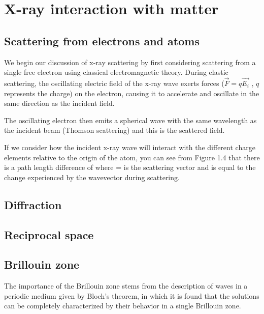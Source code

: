 \section{X-ray interaction with matter}

\subsection{Scattering from electrons and atoms}

We begin our discussion of x-ray scattering by first considering scattering from a single free electron using classical electromagnetic theory. During elastic scattering, the oscillating electric field of the x-ray wave exerts forces ($\vec{F} = q \vec{E_i}$ , $q$ represents the charge) on the electron, causing it to accelerate and oscillate in the same direction as the incident field.

The oscillating electron then emits a spherical wave with the same wavelength as the incident beam (Thomson scattering) and this is the scattered field.

If we consider how the incident x-ray wave will interact with the different charge elements relative to the origin of the atom, you can see from Figure 1.4 that there is a path length difference of   where  =  is the scattering vector and is equal to the change experienced by the wavevector during scattering.

\subsection{Diffraction}



\lipsum


\subsection{Reciprocal space}



\lipsum


\subsection{Brillouin zone}

The importance of the Brillouin zone stems from the description of waves in a periodic medium given by Bloch's theorem, in which it is found that the solutions can be completely characterized by their behavior in a single Brillouin zone.

